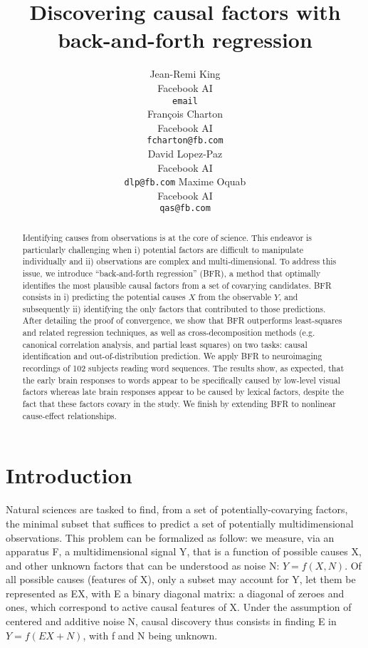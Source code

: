 \documentclass{article}
\title{Discovering causal factors with back-and-forth regression}
\author{%
  Jean-Remi King\\
  Facebook AI\\
  \texttt{email} \\
  \And
  Fran\c{c}ois Charton\\
  Facebook AI\\
  \texttt{fcharton@fb.com}\\
  \And
  David Lopez-Paz\\
  Facebook AI\\
  \texttt{dlp@fb.com}
  \And
  Maxime Oquab\\
  Facebook AI\\
  \texttt{qas@fb.com}
}
\begin{document}
\maketitle

\begin{abstract}
Identifying causes from observations is at the core of science. This endeavor
is particularly challenging when i) potential factors are difficult to
manipulate individually and ii) observations are complex and multi-dimensional.
To address this issue, we introduce ``back-and-forth regression'' (BFR), a
method that optimally identifies the most plausible causal factors from a set
of covarying candidates. BFR consists in i) predicting the potential causes $X$
from the observable $Y$, and subsequently ii) identifying the only factors that
contributed to those predictions. After detailing the proof of convergence, we
show that BFR outperforms least-squares and related regression techniques, as
well as cross-decomposition methods (e.g. canonical correlation analysis, and
partial least squares) on two tasks: causal identification and out-of-distribution
prediction. We apply BFR to neuroimaging recordings of 102 subjects reading word
sequences. The results show, as expected, that the early brain responses to
words appear to be specifically caused by low-level visual factors whereas late
brain responses appear to be caused by lexical factors, despite the fact that
these factors covary in the study. We finish by extending BFR to nonlinear cause-effect relationships.
\end{abstract}

\section{Introduction}

Natural sciences are tasked to find, from a set of potentially-covarying factors, the minimal subset that suffices to predict a set of potentially multidimensional observations.
%
This problem can be formalized as follow: we measure, via an apparatus F, a multidimensional signal Y, that is a function of possible causes X, and other unknown factors that can be understood as noise N: $Y=f(X,N)$.
%
Of all possible causes (features of X), only a subset may account for Y, let them be represented as EX, with E a binary diagonal matrix: a diagonal of zeroes and ones, which correspond to active causal features of X.
%
Under the assumption of centered and additive noise N, causal discovery thus consists in finding E in $Y=f(EX+N)$, with f and N being unknown.
\end{document}
